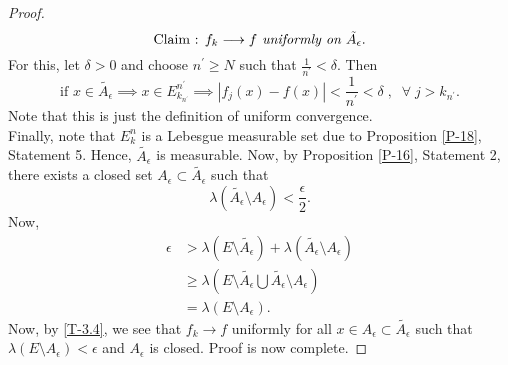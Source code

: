 \documentclass{article}
\theoremstyle{definition}
\theoremstyle{remark}
\theoremstyle{definition}
\theoremstyle{definition}
\theoremstyle{definition}
\newcommand{\abs}[1]{\left \vert #1\right \vert}
\newcommand{\bunion}{\bigcup}
\newcommand{\lm}[1]{\lambda\left (#1\right )}
\begin{document}
\begin{proof}
\[\text{Claim : \textit{$ f_k \longrightarrow f $ uniformly on $ \tilde{A_\epsilon} $}.}\]
For this, let $ \delta > 0 $ and choose $ n^{\prime}\ge N $ such that $ \frac{1}{n^{\prime}} < \delta $. Then
\begin{equation}\label{T-3.4}
	\text{if } x\in \tilde{A_{\epsilon}} \implies x\in E_{k_{n^{\prime}}}^{n^{\prime}} \implies \abs{f_j(x) - f(x)} < \frac{1}{n^{\prime}} <\delta\;,\;\;\forall\;j > k_{n^{\prime}}.
\end{equation}
Note that this is just the definition of uniform convergence. \\
Finally, note that $ E_k^{n} $ is a Lebesgue measurable set due to Proposition \ref{P-18}, Statement 5. Hence, $ \tilde{A_\epsilon} $ is measurable. Now, by Proposition \ref{P-16}, Statement 2, there exists a closed set $ A_\epsilon \subset \tilde{A_\epsilon} $ such that \[\lm{\tilde{A_\epsilon} \setminus A_\epsilon} < \frac{\epsilon}{2}.\]
Now,
\begin{equation*}
	\begin{split}
	\epsilon &>	\lm{E\setminus \tilde{A_\epsilon} } + \lm{\tilde{A_\epsilon}\setminus A_\epsilon}\\
	&\ge \lm{E\setminus \tilde{A_\epsilon} \bunion \tilde{A_\epsilon}\setminus A_\epsilon}\\
	&= \lm{E\setminus A_\epsilon}.
	\end{split}
\end{equation*}
Now, by \eqref{T-3.4}, we see that $ f_k \longrightarrow f $ uniformly for all $ x\in A_\epsilon \subset \tilde{A_\epsilon} $ such that $ \lm{E\setminus A_\epsilon}< \epsilon $ and $ A_\epsilon $ is closed. Proof is now complete.
\end{proof}
\hrulefill
\end{document}
